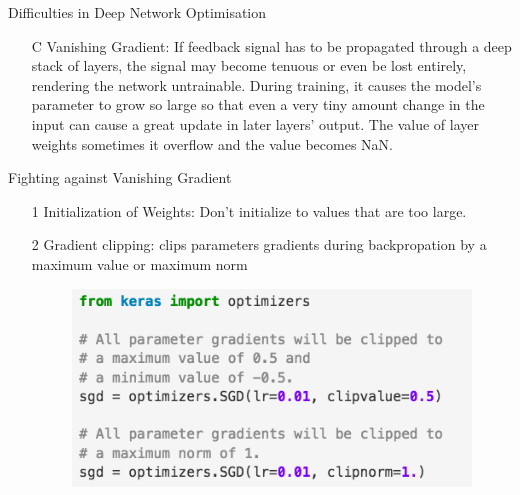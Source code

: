 \documentclass[xcolor=pdftex,dvipsnames,table,mathserif]{beamer}
\begin{document}
\begin{frame}{Difficulties in Deep Network Optimisation}
\begin{itemize}
\item[C] {Vanishing Gradient:} If feedback signal has to be propagated through a deep stack of layers, the signal may become tenuous or even be lost entirely, rendering the network untrainable. During training, it causes the model's parameter to grow so large so that even a very tiny amount change in the input can cause a great update in later layers' output. The value of layer weights sometimes it overflow and the value becomes \alert{NaN}.
\end{itemize}
\end{frame}


\begin{frame}{Fighting against Vanishing Gradient \cite{pascanu2013difficulty}}
\begin{enumerate}
\item[1] Initialization of Weights: Don't initialize to values that are too large.
\item[2] Gradient clipping: clips parameters gradients during backpropation by a maximum value or maximum norm 
\begin{figure}
\includegraphics[width=.75\columnwidth]{../graphics/KerasClip}
\end{figure}
\end{enumerate}
\end{frame}
\end{document}

